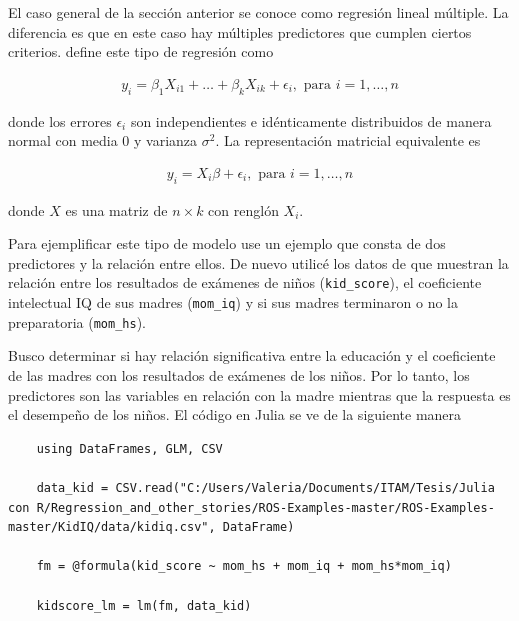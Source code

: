 El caso general de la sección anterior se conoce como regresión lineal múltiple. La diferencia es que en este caso hay múltiples predictores que cumplen ciertos criterios. \cite{regression_other_stories} define este tipo de regresión como 

\begin{equation*}
    \begin{aligned}
    y_i = \beta_1 X_{i1} + \dots + \beta_k X_{ik} + \epsilon_i, \text{ para } i = 1, \dots, n
    \end{aligned}
\end{equation*}

donde los errores $\epsilon_i$ son independientes e idénticamente distribuidos de manera normal con media 0 y varianza $\sigma^2$. La representación matricial equivalente es 

\begin{equation} \label{eq_rlm}
    \begin{aligned}
        y_i = X_i \beta + \epsilon_i, \text{ para } i = 1, \dots, n
    \end{aligned}
\end{equation}

donde $X$ es una matriz de $n \times k$ con renglón $X_i$.

Para ejemplificar este tipo de modelo use un ejemplo que consta de dos predictores y la relación entre ellos. De nuevo utilicé los datos de \cite{regression_other_stories} que muestran la relación entre los resultados de exámenes de niños (\texttt{kid\_score}), el coeficiente intelectual IQ de sus madres (\texttt{mom\_iq}) y si sus madres terminaron o no la preparatoria (\texttt{mom\_hs}). 

Busco determinar si hay relación significativa entre la educación y el coeficiente de las madres con los resultados de exámenes de los niños. Por lo tanto, los predictores son las variables en relación con la madre mientras que la respuesta es el desempeño de los niños. El código en Julia se ve de la siguiente manera

\begin{verbatim}
    using DataFrames, GLM, CSV

    data_kid = CSV.read("C:/Users/Valeria/Documents/ITAM/Tesis/Julia con R/Regression_and_other_stories/ROS-Examples-master/ROS-Examples-master/KidIQ/data/kidiq.csv", DataFrame)

    fm = @formula(kid_score ~ mom_hs + mom_iq + mom_hs*mom_iq)

    kidscore_lm = lm(fm, data_kid)
\end{verbatim}

